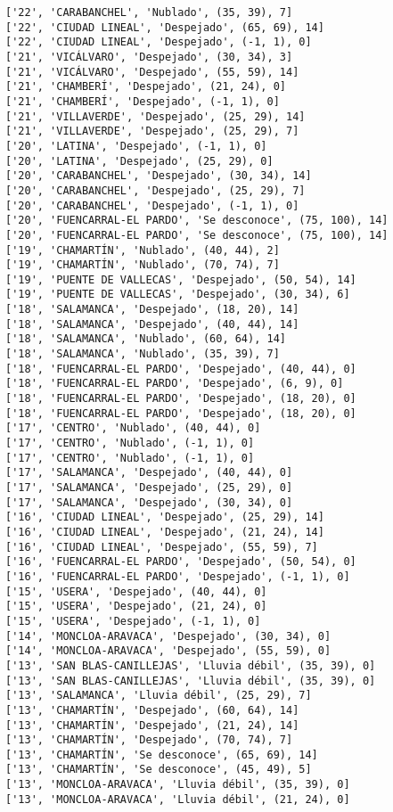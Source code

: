 \documentclass[11pt]{article}
\begin{document}
\begin{Verbatim}[commandchars=\\\{\}]
['22', 'CARABANCHEL', 'Nublado', (35, 39), 7]
['22', 'CIUDAD LINEAL', 'Despejado', (65, 69), 14]
['22', 'CIUDAD LINEAL', 'Despejado', (-1, 1), 0]
['21', 'VICÁLVARO', 'Despejado', (30, 34), 3]
['21', 'VICÁLVARO', 'Despejado', (55, 59), 14]
['21', 'CHAMBERÍ', 'Despejado', (21, 24), 0]
['21', 'CHAMBERÍ', 'Despejado', (-1, 1), 0]
['21', 'VILLAVERDE', 'Despejado', (25, 29), 14]
['21', 'VILLAVERDE', 'Despejado', (25, 29), 7]
['20', 'LATINA', 'Despejado', (-1, 1), 0]
['20', 'LATINA', 'Despejado', (25, 29), 0]
['20', 'CARABANCHEL', 'Despejado', (30, 34), 14]
['20', 'CARABANCHEL', 'Despejado', (25, 29), 7]
['20', 'CARABANCHEL', 'Despejado', (-1, 1), 0]
['20', 'FUENCARRAL-EL PARDO', 'Se desconoce', (75, 100), 14]
['20', 'FUENCARRAL-EL PARDO', 'Se desconoce', (75, 100), 14]
['19', 'CHAMARTÍN', 'Nublado', (40, 44), 2]
['19', 'CHAMARTÍN', 'Nublado', (70, 74), 7]
['19', 'PUENTE DE VALLECAS', 'Despejado', (50, 54), 14]
['19', 'PUENTE DE VALLECAS', 'Despejado', (30, 34), 6]
['18', 'SALAMANCA', 'Despejado', (18, 20), 14]
['18', 'SALAMANCA', 'Despejado', (40, 44), 14]
['18', 'SALAMANCA', 'Nublado', (60, 64), 14]
['18', 'SALAMANCA', 'Nublado', (35, 39), 7]
['18', 'FUENCARRAL-EL PARDO', 'Despejado', (40, 44), 0]
['18', 'FUENCARRAL-EL PARDO', 'Despejado', (6, 9), 0]
['18', 'FUENCARRAL-EL PARDO', 'Despejado', (18, 20), 0]
['18', 'FUENCARRAL-EL PARDO', 'Despejado', (18, 20), 0]
['17', 'CENTRO', 'Nublado', (40, 44), 0]
['17', 'CENTRO', 'Nublado', (-1, 1), 0]
['17', 'CENTRO', 'Nublado', (-1, 1), 0]
['17', 'SALAMANCA', 'Despejado', (40, 44), 0]
['17', 'SALAMANCA', 'Despejado', (25, 29), 0]
['17', 'SALAMANCA', 'Despejado', (30, 34), 0]
['16', 'CIUDAD LINEAL', 'Despejado', (25, 29), 14]
['16', 'CIUDAD LINEAL', 'Despejado', (21, 24), 14]
['16', 'CIUDAD LINEAL', 'Despejado', (55, 59), 7]
['16', 'FUENCARRAL-EL PARDO', 'Despejado', (50, 54), 0]
['16', 'FUENCARRAL-EL PARDO', 'Despejado', (-1, 1), 0]
['15', 'USERA', 'Despejado', (40, 44), 0]
['15', 'USERA', 'Despejado', (21, 24), 0]
['15', 'USERA', 'Despejado', (-1, 1), 0]
['14', 'MONCLOA-ARAVACA', 'Despejado', (30, 34), 0]
['14', 'MONCLOA-ARAVACA', 'Despejado', (55, 59), 0]
['13', 'SAN BLAS-CANILLEJAS', 'Lluvia débil', (35, 39), 0]
['13', 'SAN BLAS-CANILLEJAS', 'Lluvia débil', (35, 39), 0]
['13', 'SALAMANCA', 'Lluvia débil', (25, 29), 7]
['13', 'CHAMARTÍN', 'Despejado', (60, 64), 14]
['13', 'CHAMARTÍN', 'Despejado', (21, 24), 14]
['13', 'CHAMARTÍN', 'Despejado', (70, 74), 7]
['13', 'CHAMARTÍN', 'Se desconoce', (65, 69), 14]
['13', 'CHAMARTÍN', 'Se desconoce', (45, 49), 5]
['13', 'MONCLOA-ARAVACA', 'Lluvia débil', (35, 39), 0]
['13', 'MONCLOA-ARAVACA', 'Lluvia débil', (21, 24), 0]

\end{Verbatim}
\end{document}
